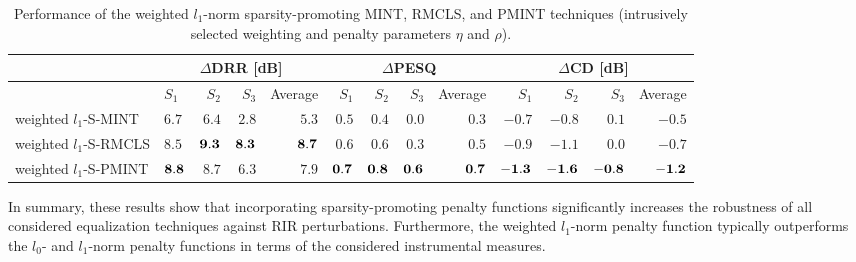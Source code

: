 \documentclass[10pt]{IEEEtran}
\begin{document}
\begin{table}[t!]
\begin{center}
  \caption{Performance of the weighted $l_1$-norm sparsity-promoting MINT, RMCLS, and PMINT techniques (intrusively selected weighting and penalty parameters $\eta$ and $\rho$).}
  \label{tbl: wl1_s}
  \begin{tabularx}{\linewidth}{X|lrrr|rrrr|rrrr|}
    \toprule
    & \multicolumn{4}{c}{$\Delta$DRR [dB]} & \multicolumn{4}{|c|}{$\Delta$PESQ} & \multicolumn{4}{c|}{$\Delta$CD [dB]} \\
    \midrule
      & $S_1$ & $S_2$ & $S_3$ & Average &$S_1$ & $S_2$ & $S_3$ & Average& $S_1$ & $S_2$ & $S_3$ & Average\\
    \midrule
      weighted $l_1$-S-MINT & $6.7$ & $6.4$ & $2.8$ & $5.3$ & $0.5$ & $0.4$ & $0.0$ & $0.3$ & $-0.7$ & $-0.8$ & $0.1$ & $-0.5$\\
      weighted $l_1$-S-RMCLS & $8.5$ & $\bf 9.3$ & $\bf 8.3$ & $\bf8.7$ & $0.6$ & $0.6$ & $0.3$ & $0.5$ & $-0.9$ & $-1.1$ & $0.0$ & $-0.7$\\
      weighted $l_1$-S-PMINT & $\bf{8.8}$ & $8.7$ & $6.3$ & $7.9$ & $\bf 0.7$ & $\bf{0.8}$ & $\bf{0.6}$ &$\bf 0.7$ & $\bf -1.3$ & $\bf -1.6$ & $\bf{-0.8}$ & $\bf -1.2$\\
    \bottomrule
  \end{tabularx}
\end{center}
\end{table}
In summary, these results show that incorporating sparsity-promoting penalty functions significantly increases the robustness of all considered equalization techniques against RIR perturbations. 
Furthermore, the weighted $l_1$-norm penalty function typically outperforms the $l_0$- and $l_1$-norm penalty functions in terms of the considered instrumental measures.
\end{document}
